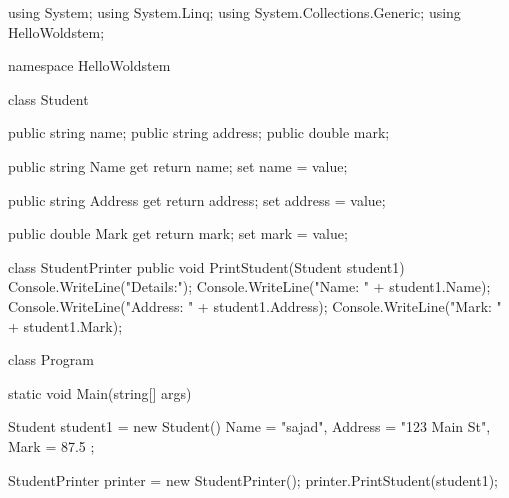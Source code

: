 using System;
using System.Linq;
using System.Collections.Generic;
using HelloWoldstem;

namespace HelloWoldstem
{
    class Student
    {
        public string name;
        public string address;
        public double mark;

        public string Name
        {
            get { return name; }
            set { name = value; }
        }

        public string Address
        {
            get { return address; }
            set { address = value; }
        }

        public double Mark
        {
            get { return mark; }
            set { mark = value; }
        }
    }

    class StudentPrinter
    {
        public void PrintStudent(Student student1)
        {
            Console.WriteLine("\nStudent Details:");
            Console.WriteLine("Name: " + student1.Name);
            Console.WriteLine("Address: " + student1.Address);
            Console.WriteLine("Mark: " + student1.Mark);
        }
    }

    class Program
    {
        static void Main(string[] args)
        {
            Student student1 = new Student()
            {
                Name = "sajad",
                Address = "123 Main St",
                Mark = 87.5
            };

            StudentPrinter printer = new StudentPrinter();
            printer.PrintStudent(student1);
        }
    }
}

